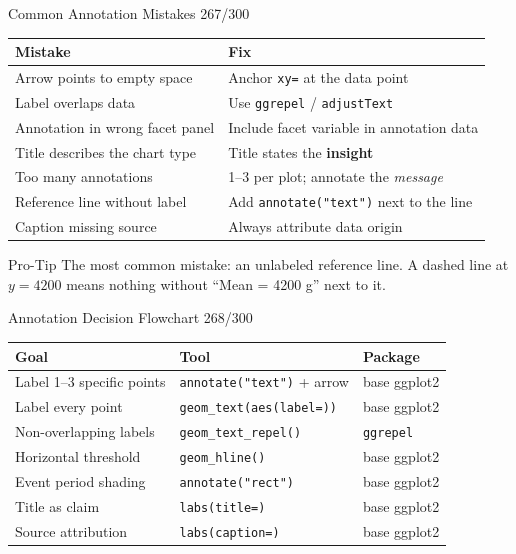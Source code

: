 \documentclass[10pt]{beamer}
\newcommand{\smark}[1]{\hfill{\scriptsize\color{codegray}#1}}
\begin{document}
\begin{frame}{Common Annotation Mistakes}
\smark{267/300}
\centering\small
\begin{tabular}{@{}ll@{}}
    \toprule
    \textbf{Mistake} & \textbf{Fix} \\
    \midrule
    Arrow points to empty space           & Anchor \texttt{xy=} at the data point \\
    Label overlaps data                   & Use \texttt{ggrepel} / \texttt{adjustText} \\
    Annotation in wrong facet panel       & Include facet variable in annotation data \\
    Title describes the chart type        & Title states the \textbf{insight} \\
    Too many annotations                  & 1--3 per plot; annotate the \emph{message} \\
    Reference line without label          & Add \texttt{annotate("text")} next to the line \\
    Caption missing source                & Always attribute data origin \\
    \bottomrule
\end{tabular}

\vspace{0.3cm}
\begin{alertblock}{Pro-Tip}
    \scriptsize The most common mistake: an unlabeled reference line. A dashed line at $y=4200$ means nothing without ``Mean = 4200 g'' next to it.
\end{alertblock}
\end{frame}

\begin{frame}{Annotation Decision Flowchart}
\smark{268/300}
\centering\small
\begin{tabular}{@{}lll@{}}
    \toprule
    \textbf{Goal} & \textbf{Tool} & \textbf{Package} \\
    \midrule
    Label 1--3 specific points  & \texttt{annotate("text")} + arrow & base ggplot2 \\
    Label every point           & \texttt{geom\_text(aes(label=))}  & base ggplot2 \\
    Non-overlapping labels      & \texttt{geom\_text\_repel()}      & \texttt{ggrepel} \\
    Horizontal threshold        & \texttt{geom\_hline()}            & base ggplot2 \\
    Event period shading        & \texttt{annotate("rect")}         & base ggplot2 \\
    Title as claim              & \texttt{labs(title=)}              & base ggplot2 \\
    Source attribution           & \texttt{labs(caption=)}           & base ggplot2 \\
    \bottomrule
\end{tabular}
\end{frame}
\end{document}
